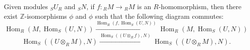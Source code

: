 Given modules ${}_S U_R$ and ${}_S N$, if $f: {}_R M \to {}_R M$ is an $R$-homomorphism, then there exist $\mathbb{Z}$-isomorphisms $\phi$ and $\phi$ such that the following diagram commutes:
$$\operatorname{Hom}_R(M, \operatorname{Hom}_S(U, N)) \xrightarrow{\operatorname{Hom}_R(f, \operatorname{Hom}_S(U, N))} \operatorname{Hom}_R(M, \operatorname{Hom}_S(U, N))$$
$$\operatorname{Hom}_S((U \otimes_R M), N) \xrightarrow{\operatorname{Hom}_S((U \otimes_R f), N)} \operatorname{Hom}_S((U \otimes_R M), N).$$
